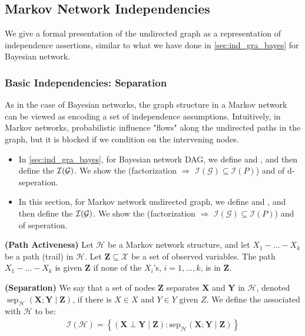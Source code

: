 \documentclass{article}
\newcommand{\bfs}[1]{\textbf{({#1}) }}
\begin{document}
\subsection{Markov Network Independencies}\label{sec:ixsadf}
We give a formal presentation of the undirected graph as a representation of independence assertions, similar to what we have done in \cref{sec:ind_gra_bayes} for Bayesian network. 
\subsubsection{Basic Independencies: Separation}
As in the case of Bayesian networks, the graph structure in a Markov network can be viewed as encoding a set of independence assumptions. Intuitively, in Markov networks, probabilistic influence "flows" along the undirected paths in the graph, but it is blocked if we condition on the intervening nodes.
\begin{itemize}
    \item In \cref{sec:ind_gra_bayes}, for Bayesian network DAG, we define  and , and then define the  $\mathcal{I}(\mathcal{G})$. We show the  (factorization $\Rightarrow$ $\mathcal{I}(\mathcal{G}) \subseteq \mathcal{I}(P)$) and  of d-seperation.  
    \item In this section, for Markov network undirected graph, we define  and , and then define the  $\mathcal{I}(\mathcal{G})$. We show the  (factorization $\Rightarrow$ $\mathcal{I}(\mathcal{G}) \subseteq \mathcal{I}(P)$) and  of seperation. 
\end{itemize}
\begin{defa}\bfs{Path Activeness}
Let $\mathcal{H}$ be a Markov network structure, and let $X_{1}-\ldots-X_{k}$ be a path (trail) in $\mathcal{H} .$ Let $\boldsymbol{Z} \subseteq \mathcal{X}$ be a set of observed variables. The path $X_{1}-\ldots-X_{k}$ is  given $\boldsymbol{Z}$ if none of the $X_{i}$'s, $i=1, \ldots, k$, is in $\boldsymbol{Z}$.
\end{defa}
\begin{defa}\bfs{Separation}
We say that a set of nodes $\boldsymbol{Z}$ separates $\boldsymbol{X}$ and $\boldsymbol{Y}$ in $\mathcal{H}$, denoted $\operatorname{sep}_{\mathcal{H}}(\boldsymbol{X} ; \boldsymbol{Y} \mid \boldsymbol{Z})$, if there is  $X \in X$ and $Y \in Y$ given $Z$. We define the  associated with $\mathcal{H}$ to be:
\begin{align*}
\mathcal{I}(\mathcal{H})=\left\{(\boldsymbol{X} \perp \boldsymbol{Y} \mid \boldsymbol{Z}): \mathrm{sep}_{\mathcal{H}}(\boldsymbol{X} ; \boldsymbol{Y} \mid \boldsymbol{Z})\right\}
\end{align*}
\end{defa}
\end{document}
